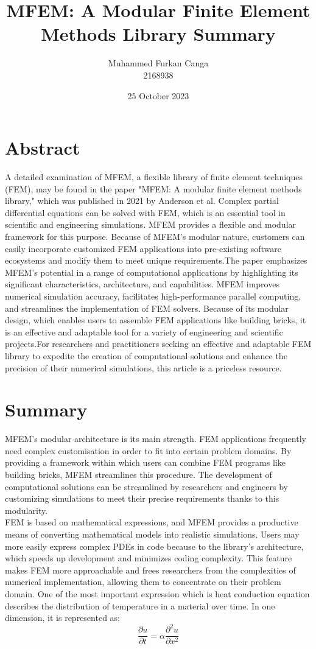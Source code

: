 \documentclass[11pt,a4paper]{article}
\title{MFEM: A Modular Finite Element Methods Library Summary}
\author{Muhammed Furkan Canga \\ 2168938}
\date{25 October 2023}
\begin{document}
\maketitle

\section{Abstract}

A detailed examination of MFEM, a flexible library of finite element techniques (FEM), may be found in the paper "MFEM: A modular finite element methods library," which was published in 2021 by Anderson et al. Complex partial differential equations can be solved with FEM, which is an essential tool in scientific and engineering simulations. MFEM provides a flexible and modular framework for this purpose. Because of MFEM's modular nature, customers can easily incorporate customized FEM applications into pre-existing software ecosystems and modify them to meet unique requirements.The paper emphasizes MFEM's potential in a range of computational applications by highlighting its significant characteristics, architecture, and capabilities. MFEM improves numerical simulation accuracy, facilitates high-performance parallel computing, and streamlines the implementation of FEM solvers. Because of its modular design, which enables users to assemble FEM applications like building bricks, it is an effective and adaptable tool for a variety of engineering and scientific projects.For researchers and practitioners seeking an effective and adaptable FEM library to expedite the creation of computational solutions and enhance the precision of their numerical simulations, this article is a priceless resource.


\section{Summary}
MFEM's modular architecture is its main strength. FEM applications frequently need complex customisation in order to fit into certain problem domains. By providing a framework within which users can combine FEM programs like building bricks, MFEM streamlines this procedure. The development of computational solutions can be streamlined by researchers and engineers by customizing simulations to meet their precise requirements thanks to this modularity.
\\
FEM is based on mathematical expressions, and MFEM provides a productive means of converting mathematical models into realistic simulations. Users may more easily express complex PDEs in code because to the library's architecture, which speeds up development and minimizes coding complexity. This feature makes FEM more approachable and frees researchers from the complexities of numerical implementation, allowing them to concentrate on their problem domain.
One of the most important expression which is heat conduction equation describes the distribution of temperature in a material over time. In one dimension, it is represented as:
\begin{equation}
\frac{\partial u}{\partial t} = \alpha \frac{\partial^2 u}{\partial x^2}
\end{equation}
\end{document}
